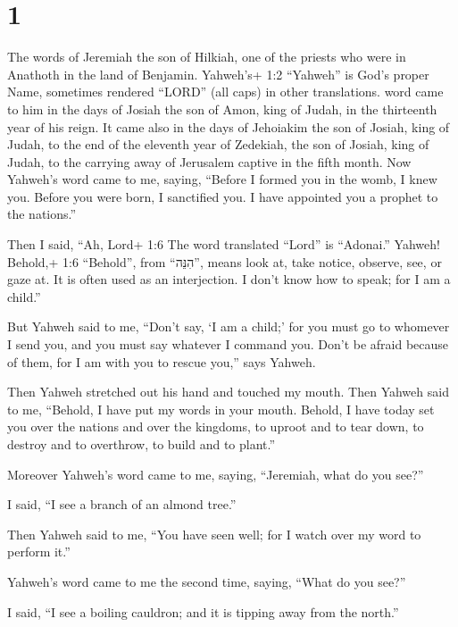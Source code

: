\hypertarget{section}{%
\section{1}\label{section}}

 The words of Jeremiah the son of Hilkiah, one of the
priests who were in Anathoth in the land of Benjamin. 
Yahweh's+ 1:2 ``Yahweh'' is God's proper Name, sometimes rendered
``LORD'' (all caps) in other translations. word came to him in the days
of Josiah the son of Amon, king of Judah, in the thirteenth year of his
reign.  It came also in the days of Jehoiakim the son of
Josiah, king of Judah, to the end of the eleventh year of Zedekiah, the
son of Josiah, king of Judah, to the carrying away of Jerusalem captive
in the fifth month.  Now Yahweh's word came to me, saying,
 ``Before I formed you in the womb, I knew you. Before you
were born, I sanctified you. I have appointed you a prophet to the
nations.''

 Then I said, ``Ah, Lord+ 1:6 The word translated ``Lord''
is ``Adonai.'' Yahweh! Behold,+ 1:6 ``Behold'', from ``הִנֵּה'', means
look at, take notice, observe, see, or gaze at. It is often used as an
interjection. I don't know how to speak; for I am a child.''

 But Yahweh said to me, ``Don't say, `I am a child;' for you
must go to whomever I send you, and you must say whatever I command you.
 Don't be afraid because of them, for I am with you to
rescue you,'' says Yahweh.

 Then Yahweh stretched out his hand and touched my mouth.
Then Yahweh said to me, ``Behold, I have put my words in your mouth.
 Behold, I have today set you over the nations and over the
kingdoms, to uproot and to tear down, to destroy and to overthrow, to
build and to plant.''

 Moreover Yahweh's word came to me, saying, ``Jeremiah,
what do you see?''

I said, ``I see a branch of an almond tree.''

 Then Yahweh said to me, ``You have seen well; for I watch
over my word to perform it.''

 Yahweh's word came to me the second time, saying, ``What
do you see?''

I said, ``I see a boiling cauldron; and it is tipping away from the
north.''

